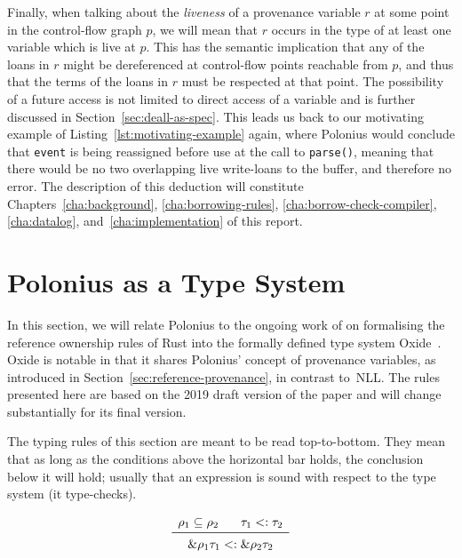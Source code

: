 \documentclass[11pt,a4paper,twoside,openany]{report}
\newcommand{\InRust}[1]{\texttt{#1}}
\newcommand{\ntyperule}[2]{\begin{array}{c}#1\\\midrule\raisebox{1pt}{\strut}#2\end{array}}
\begin{document}
Finally, when talking about the \emph{liveness} of a provenance variable $r$ at
some point in the control-flow graph $p$, we will mean that $r$ occurs in the
type of at least one variable which is live at $p$. This has the semantic
implication that any of the loans in $r$ might be dereferenced at control-flow
points reachable from $p$, and thus that the terms of the loans in $r$ must be
respected at that point. The possibility of a future access is not limited to
direct access of a variable and is further discussed in
Section~\ref{sec:deall-as-spec}. This leads us back to our motivating example of
Listing~\ref{lst:motivating-example} again, where Polonius would conclude that
\InRust{event} is being reassigned before use at the call to \InRust{parse()},
meaning that there would be no two overlapping live write-loans to the buffer,
and therefore no error. The description of this deduction will constitute
Chapters~\ref{cha:background}, \ref{cha:borrowing-rules},
\ref{cha:borrow-check-compiler}, \ref{cha:datalog}, and~\ref{cha:implementation}
of this report.


\section{Polonius as a Type System}\label{sec:type-system}

In this section, we will relate Polonius to the ongoing work of
\citeauthor*{weiss_oxide:_2019} on formalising the reference ownership rules of
Rust into the formally defined type system Oxide~\cite{weiss_oxide:_2019}. Oxide
is notable in that it shares Polonius' concept of provenance variables, as
introduced in Section~\ref{sec:reference-provenance}, in contrast to~NLL\@. The
rules presented here are based on the 2019 draft version of the paper and will
change substantially for its final version.

The typing rules of this section are meant to be read top-to-bottom. They mean
that as long as the conditions above the horizontal bar holds, the conclusion
below it will hold; usually that an expression is sound with respect to the type
system (it type-checks).

\begin{equation}\label{eq:s-ref-baby}
  \ntyperule{
    \rho_1 \subseteq \rho_2 \:\:\:\:\:\:\:\:
    \tau_1 <: \tau_2
  }%
  {
    \&\rho_1 \tau_1 <: \&\rho_2 \tau_2
  }
\end{equation}
\end{document}
